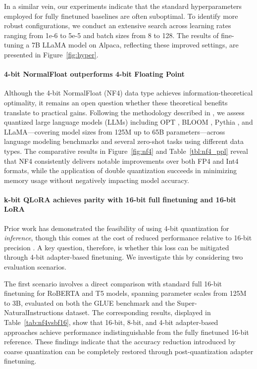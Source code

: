 In a similar vein, our experiments indicate that the standard hyperparameters employed for fully finetuned baselines are often suboptimal. To identify more robust configurations, we conduct an extensive search across learning rates ranging from 1e-6 to 5e-5 and batch sizes from 8 to 128. The results of fine-tuning a 7B LLaMA model on Alpaca, reflecting these improved settings, are presented in Figure~\ref{fig:hyper}.

\paragraph{4-bit NormalFloat outperforms 4-bit Floating Point}

Although the 4-bit NormalFloat (NF4) data type achieves information-theoretical optimality, it remains an open question whether these theoretical benefits translate to practical gains. Following the methodology described in \citet{dettmers2022case}, we assess quantized large language models (LLMs) including OPT \citep{zhang2022opt}, BLOOM \cite{scao2022bloom}, Pythia \cite{biderman2023pythia}, and LLaMA—covering model sizes from 125M up to 65B parameters—across language modeling benchmarks and several zero-shot tasks using different data types. The comparative results in Figure~\ref{fig:nf4} and Table~\ref{tbl:nf4_ppl} reveal that NF4 consistently delivers notable improvements over both FP4 and Int4 formats, while the application of double quantization succeeds in minimizing memory usage without negatively impacting model accuracy.

\paragraph{k-bit \textsc{QLoRA} achieves parity with 16-bit full finetuning and 16-bit LoRA}

Prior work has demonstrated the feasibility of using 4-bit quantization for \emph{inference}, though this comes at the cost of reduced performance relative to 16-bit precision \citep{dettmers2022case,frantar2022gptq}. A key question, therefore, is whether this loss can be mitigated through 4-bit adapter-based finetuning. We investigate this by considering two evaluation scenarios.

The first scenario involves a direct comparison with standard full 16-bit finetuning for RoBERTA and T5 models, spanning parameter scales from 125M to 3B, evaluated on both the GLUE benchmark and the Super-NaturalInstructions dataset. The corresponding results, displayed in Table~\ref{tab:nf4vsbf16}, show that 16-bit, 8-bit, and 4-bit adapter-based approaches achieve performance indistinguishable from the fully finetuned 16-bit reference. These findings indicate that the accuracy reduction introduced by coarse quantization can be completely restored through post-quantization adapter finetuning.

